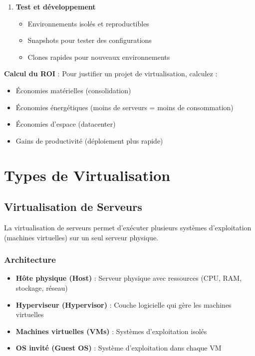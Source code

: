 \documentclass[11pt,a4paper]{article}
\begin{document}
\begin{enumerate}
    \item \textbf{Test et développement}
    \begin{itemize}
        \item Environnements isolés et reproductibles
        \item Snapshots pour tester des configurations
        \item Clones rapides pour nouveaux environnements
    \end{itemize}
\end{enumerate}

\begin{tipbox}
\textbf{Calcul du ROI} : Pour justifier un projet de virtualisation, calculez :
\begin{itemize}
    \item Économies matérielles (consolidation)
    \item Économies énergétiques (moins de serveurs = moins de consommation)
    \item Économies d'espace (datacenter)
    \item Gains de productivité (déploiement plus rapide)
\end{itemize}
\end{tipbox}

\section{Types de Virtualisation}

\subsection{Virtualisation de Serveurs}

La virtualisation de serveurs permet d'exécuter plusieurs systèmes d'exploitation (machines virtuelles) sur un seul serveur physique.

\subsubsection{Architecture}

\begin{itemize}
    \item \textbf{Hôte physique (Host)} : Serveur physique avec ressources (CPU, RAM, stockage, réseau)
    \item \textbf{Hyperviseur (Hypervisor)} : Couche logicielle qui gère les machines virtuelles
    \item \textbf{Machines virtuelles (VMs)} : Systèmes d'exploitation isolés
    \item \textbf{OS invité (Guest OS)} : Système d'exploitation dans chaque VM
\end{itemize}
\end{document}
